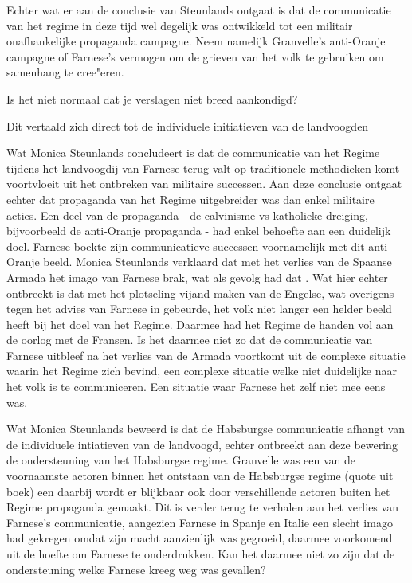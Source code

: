\documentclass[11pt]{amsart}
\begin{document}
Echter wat er aan de conclusie van Steunlands ontgaat is dat de communicatie van het regime in deze tijd wel degelijk
was ontwikkeld tot een militair onafhankelijke propaganda campagne. Neem namelijk Granvelle's anti-Oranje campagne of
Farnese's vermogen om de grieven van het volk te gebruiken om samenhang te cree"eren.

Is het niet normaal dat je verslagen niet breed aankondigd?

Dit vertaald zich direct tot de individuele initiatieven van de landvoogden

Wat Monica Steunlands concludeert is dat de communicatie van het Regime tijdens het landvoogdij van Farnese terug valt
op traditionele methodieken komt voortvloeit uit het ontbreken van militaire successen. Aan deze conclusie ontgaat
echter dat propaganda van het Regime uitgebreider was dan enkel militaire acties. Een deel van de propaganda - de
calvinisme vs katholieke dreiging, bijvoorbeeld de anti-Oranje propaganda - had enkel behoefte aan een duidelijk doel.
Farnese boekte zijn communicatieve successen voornamelijk met dit anti-Oranje beeld. Monica Steunlands verklaard dat
met het verlies van de Spaanse Armada het imago van Farnese brak, wat als gevolg had dat . Wat hier echter ontbreekt is
dat met het plotseling vijand maken van de Engelse, wat overigens tegen het advies van Farnese in gebeurde, het volk
niet langer een helder beeld heeft bij het doel van het Regime. Daarmee had het Regime de handen vol aan de oorlog met
de Fransen. Is het daarmee niet zo dat de communicatie van Farnese uitbleef na het verlies van de Armada voortkomt uit
de complexe situatie waarin het Regime zich bevind, een complexe situatie welke niet duidelijke naar het volk is te
communiceren. Een situatie waar Farnese het zelf niet mee eens was.

Wat Monica Steunlands beweerd is dat de Habsburgse communicatie afhangt van de individuele intiatieven van de
landvoogd, echter ontbreekt aan deze bewering de ondersteuning van het Habsburgse regime. Granvelle was een van de
voornaamste actoren binnen het ontstaan van de Habsburgse regime (quote uit boek) een daarbij wordt er blijkbaar ook
door verschillende actoren buiten het Regime propaganda gemaakt. Dit is verder terug te verhalen aan het verlies van
Farnese's communicatie, aangezien Farnese in Spanje en Italie een slecht imago had gekregen omdat zijn macht
aanzienlijk was gegroeid, daarmee voorkomend uit de hoefte om Farnese te onderdrukken. Kan het daarmee niet zo zijn dat
de ondersteuning welke Farnese kreeg weg was gevallen?
\end{document}
